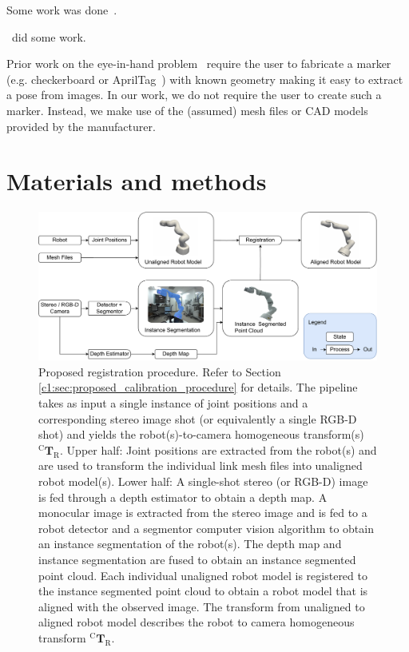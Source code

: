 Some work was done~\citep{Li_2021}.

\cite{Bhat_2021_CVPR}~did some work.

Prior work on the eye-in-hand problem~\cite{Horaud95, Strobl06} require the user to fabricate a marker (e.g. checkerboard or AprilTag~\cite{Olson11}) with known geometry making it easy to extract a pose from images.
In our work, we do not require the user to create such a marker.
Instead, we make use of the (assumed) mesh files or CAD models provided by the manufacturer.

\section{Materials and methods}
\label{c1:sec:materials_and_methods}
\begin{figure}
    \centering
    \includegraphics[width=\textwidth]{fig/pipeline_refined.pdf}
    \caption{Proposed registration procedure. Refer to Section \ref{c1:sec:proposed_calibration_procedure} for details. The pipeline takes as input a single instance of joint positions and a corresponding stereo image shot (or equivalently a single RGB-D shot) and yields the robot(s)-to-camera homogeneous transform(s) $^\text{C}\mathbf{T}_\text{R}$. Upper half: Joint positions are extracted from the robot(s) and are used to transform the individual link mesh files into unaligned robot model(s).
    Lower half:
    A single-shot stereo (or RGB-D) image is fed through a depth estimator to obtain a depth map.
    A monocular image is extracted from the stereo image and is fed to a robot detector and a segmentor computer vision algorithm to obtain an instance segmentation of the robot(s).
    The depth map and instance segmentation are fused to obtain an instance segmented point cloud.
    Each individual unaligned robot model is registered to the instance segmented point cloud to obtain a robot model that is aligned with the observed image. The transform from unaligned to aligned robot model describes the robot to camera homogeneous transform $^\text{C}\mathbf{T}_\text{R}$.}
    \label{c1:fig:calibration_pipeline}
\end{figure}
